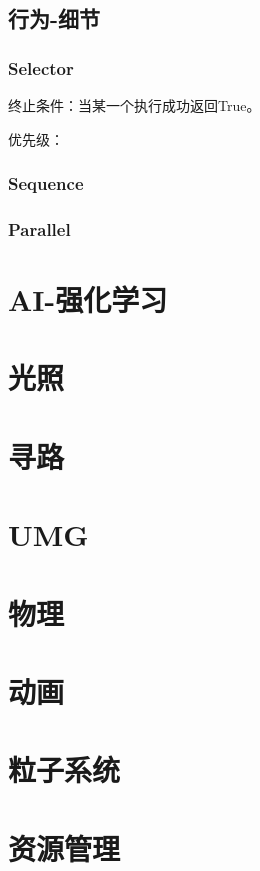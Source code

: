 \documentclass[UTF8,a4paper,12pt]{ctexbook}
\begin{document}
	
	\section{行为-细节}
		\subsection{Selector}
			终止条件：当某一个执行成功返回True。
			
			优先级：
		
		\subsection{Sequence}
			
		
		\subsection{Parallel}
		
		

\chapter{AI-强化学习}	



\chapter{光照}
	
\chapter{寻路}
	
\chapter{UMG}
		
\chapter{物理}
		
\chapter{动画}
	
\chapter{粒子系统}
							
\chapter{资源管理}
\end{document}
